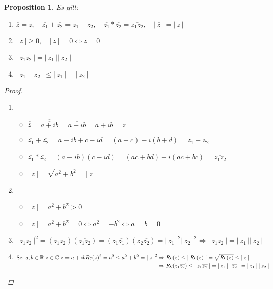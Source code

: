 \documentclass[a4paper,titlepage,oneside]{article}
\def\C{\ensuremath{\mathbb{C}} }
\def\R{\ensuremath{\mathbb{R}} }
\def\im{\ensuremath{\mathit{i}} }
\def\sp{\hspace{0,1cm}}
\newcommand{\abs}[1]{\ensuremath{\left|\:#1\:\right|}}
\theoremstyle{thmstyle}
\newtheorem{prop}[satz]{Proposition}
\begin{document}
\begin{prop}
Es gilt:
\begin{enumerate}[label=(\roman*)]
\item \( \overline{\overline{z}} = z, \quad \overline{z_1} + \overline{z_2} = \overline{z_1 + z_2}, \quad \overline{z_1}* \overline{z_2} = \overline{z_1  z_2}, \quad \abs{\overline{z}} = \abs{z} \)
\item \( \abs{z} \ge 0, \quad \abs{z} = 0 \Leftrightarrow z = 0\)
\item \(\abs{z_1 z_2} = \abs{z_1} \abs{z_2}\)
\item \(\abs{z_1 + z_2} \le \abs{z_1} + \abs{z_2}\)
\end{enumerate}
\begin{proof} \sp
\begin{enumerate}[label=(\roman*)]
\item
\begin{itemize}
\item \(\overline{\overline{z}} = \overline{\overline{a + \im b}} = \overline{a - \im b} = a + \im b = z \)
\item \(\overline{z_1} + \overline{z_2} = a - \im b + c - \im d = (a + c) - \im (b + d) = \overline{z_1 + z_2} \)
\item \(\overline{z_1} * \overline{z_2} = (a - \im b) (c - \im d) = (ac + bd) - \im (ac + bc) = \overline{z_1  z_2} \)
\item \( \abs{\overline{z}} = \sqrt{a^2 + b^2} = \abs{z}\)
\end{itemize}
\item
\begin{itemize}
\item \(\abs{z} = a^2 + b^2 > 0 \)
\item \(\abs{z} = a^2 + b^2 = 0 \Leftrightarrow a^2 = - b^2 \Leftrightarrow a = b = 0 \)
\end{itemize}
\item \(\abs{z_1 z_2}^2 = (z_1 z_2)(\overline{z_1 z_2}) = (z_1\overline{z_1})(z_2\overline{z_2}) = \abs{z_1}^2\abs{z_2}^2 \Leftrightarrow \abs{z_1 z_2} = \abs{z_1}\abs{z_2} \) 
\item  \begin{math}  
\text{Sei }a, b \in \R \sp z \in \C \sp z = a + \im b \\
\begin{aligned}[t]
Re(z)^2 = a^2 \le a^2 + b^2 = \abs{z}^2 &\Rightarrow Re(z) \le \abs{Re(z)} = \sqrt{Re(z)} \le \abs{z} \\
&\Rightarrow Re(z_1\overline{z_2}) \le \abs{z_1\overline{z_2}} = \abs{z_1}\abs{\overline{z_2}} = \abs{z_1}\abs{z_2} \\

\end{aligned}
\end{math}
\end{enumerate}
\end{proof}
\end{prop}
\end{document}
